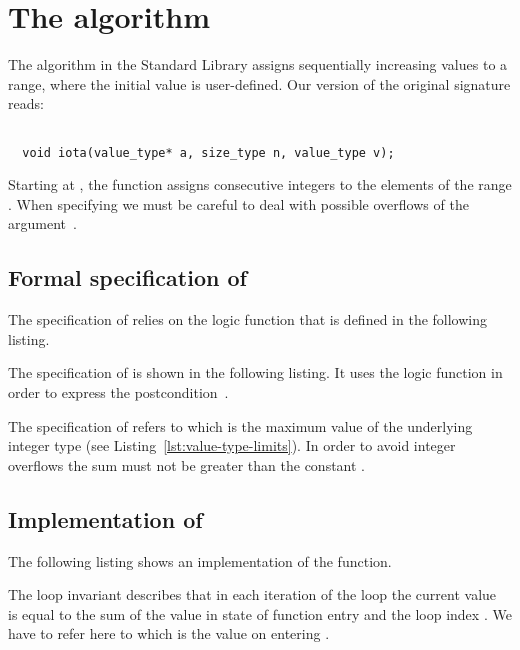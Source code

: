
\section{The \iotai algorithm}

The \iotai algorithm in the \cxx Standard Library \cite[\S 29.8.12]{cxx-17-draft} assigns sequentially
increasing values to a range,
where the initial value is user-defined.
%
Our version of the original signature
reads:

\begin{lstlisting}[style=acsl-block]

  void iota(value_type* a, size_type n, value_type v);
\end{lstlisting} 


Starting at , the function assigns consecutive
integers to the elements of the range .
When specifying \iotai we must be careful to deal with possible overflows of the argument~.


\subsection{Formal specification of \iotai}

The specification of \iotai relies on the logic function 
that is defined in the following listing.



The specification of \iotai is shown in the following listing.
It uses the logic function  in order to express the
postcondition~.



The specification of \iotai refers to  which is
the maximum value of the underlying integer type (see Listing~\ref{lst:value-type-limits}).
In order to avoid integer overflows 
the sum   must not be greater than the constant .

\clearpage

\subsection{Implementation of \iotai}

The following listing shows an implementation of the \iotai function.



The loop invariant  describes that in each iteration of the loop the current 
value~ is equal to the sum of the value  in state of function
entry and the loop index .
We have to refer here to  which is the value on entering \iotai.

\clearpage

